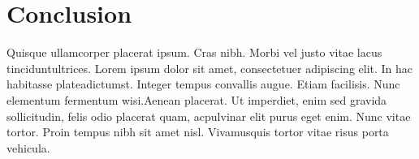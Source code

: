 \documentclass[a4paper,11pt]{texMemo}
\begin{document}
\section*{Conclusion}
Quisque ullamcorper placerat ipsum.  Cras nibh.  Morbi vel justo vitae lacus tinciduntultrices. Lorem ipsum dolor sit amet, consectetuer adipiscing elit. In hac habitasse plateadictumst. Integer tempus convallis augue. Etiam facilisis. Nunc elementum fermentum wisi.Aenean placerat. Ut imperdiet, enim sed gravida sollicitudin, felis odio placerat quam, acpulvinar elit purus eget enim. Nunc vitae tortor. Proin tempus nibh sit amet nisl. Vivamusquis tortor vitae risus porta vehicula.
\end{document}
